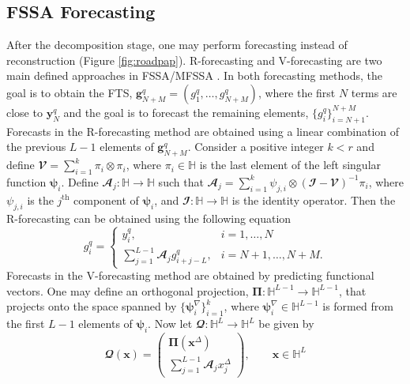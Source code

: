 \subsection{FSSA Forecasting}\label{subsec:forecast}
After the decomposition stage, one may perform forecasting instead of reconstruction (Figure \ref{fig:roadpap}). R-forecasting and V-forecasting are two main defined approaches in FSSA/MFSSA \citep{trinka2023functional}. In both forecasting methods, the goal is to obtain the FTS, $\mathbf{g}_{N+M}^{q}=\left(g_{1}^{q},\dots,g_{N+M}^{q}\right)$, where the first $N$ terms are close to $\mathbf{y}_{N}^{q}$ and the goal is to forecast the remaining elements, $\{g_{i}^{q}\}_{i=N+1}^{N+M}$.
Forecasts in the R-forecasting method are obtained using a linear combination of the previous $L-1$ elements of $\mathbf{g}_{N+M}^{q}$. Consider a positive integer $k<r$ and define $\mathbfcal{V} = \sum_{i=1}^{k} \pi_{i} \otimes \pi_{i}$, where $\pi_{i} \in \mathbb{H}$ is the last element of the left singular function $\pmb{\psi}_{i}$. Define $\mathbfcal{A}_{j}: \mathbb{H} \rightarrow \mathbb{H}$ such that $\mathbfcal{A}_{j} = \sum_{i=1}^{k}\psi_{j,i} \otimes \left(\mathbfcal{I} - \mathbfcal{V}\right)^{-1}\pi_{i}$, where $\psi_{j,i}$ is the $j^{\text{th}}$ component of $\pmb{\psi}_{i}$, and $\mathbfcal{I}:\mathbb{H} \rightarrow \mathbb{H}$ is the identity operator. Then the R-forecasting can be obtained using the following equation
\begin{equation}
	g_{i}^{q}=\begin{cases} 
		y_{i}^{q}, & i=1,\dots,N \\
		\sum_{j=1}^{L-1}\mathbfcal{A}_{j}g_{i+j-L}^{q}, & i=N+1,\dots,N+M.
	\end{cases}
\end{equation}
Forecasts in the V-forecasting method are obtained by predicting functional vectors. One may define an orthogonal projection, $\pmb{\Pi}:\mathbb{H}^{L-1} \rightarrow \mathbb{H}^{L-1}$, that projects onto the space spanned by $\{\pmb{\psi}_{i}^{\nabla}\}_{i=1}^{k}$, where $\pmb{\psi}_{i}^{\nabla} \in \mathbb{H}^{L-1}$ is formed from the first $L-1$ elements of $\pmb{\psi}_{i}$. Now let $\mathbfcal{Q}:\mathbb{H}^{L} \rightarrow \mathbb{H}^{L}$ be given by 
\begin{equation}
\mathbfcal{Q}\left(\pmb{x}\right)=\begin{pmatrix} \pmb{\Pi}\left(\pmb{x}^{\Delta}\right) \\ \sum_{j=1}^{L-1}\mathbfcal{A}_{j}x^{\Delta}_{j}\end{pmatrix}, \qquad {\pmb{x}} \in \mathbb{H}^{L} 
\end{equation}
